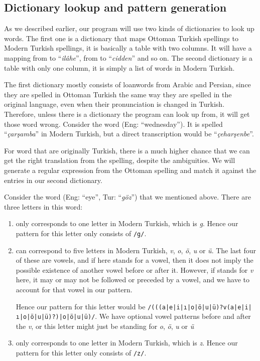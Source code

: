 \documentclass[10pt,twocolumn]{article}
\theoremstyle{nonumberplain}
\newcommand{\otto}[1]{\RLE{\ottoman{}\Large{}#1}}
\newcommand{\word}[1]{``\emph{#1}''}
\begin{document}
\subsection{Dictionary lookup and pattern generation}

As we described earlier, our program will use two kinds of dictionaries to look
up words. The first one is a dictionary that maps Ottoman Turkish spellings to
Modern Turkish spellings, it is basically a table with two columns.
It will have a mapping from \otto{الهه} to \word{ilâhe}, from \otto{جدا} to
\word{cidden} and so on. The second dictionary is a table with only one column,
it is simply a list of words in Modern Turkish.

The first dictionary mostly consists of loanwords from Arabic and Persian, since
they are spelled in Ottoman Turkish the same way they are spelled in the
original language, even when their pronunciation is changed in Turkish.
Therefore, unless there is a dictionary the program can look up from, it will
get those word wrong.
Consider the word \otto{چهارشنبه} (Eng: ``wednesday''). It is spelled
\word{çarşamba} in Modern Turkish, but a direct transcription would be
\word{çeharşenbe}.

For word that are originally Turkish, there is a much higher chance that we can
get the right translation from the spelling, despite the ambiguities.
We will generate a regular expression from the Ottoman spelling and match it
against the entries in our second dictionary.

Consider the word \otto{گوز} (Eng: ``eye'', Tur: \word{göz}) that we mentioned above.
There are three letters in this word: %
\begin{enumerate}[noitemsep,topsep=0pt]
  \item \otto{گ} only corresponds to one letter in Modern Turkish, which is
    \emph{g}. Hence our pattern for this letter only consists of \texttt{/g/}.
  \item \otto{و} can correspond to five letters in Modern Turkish, \emph{v},
    \emph{o}, \emph{ö}, \emph{u} or \emph{ü}. The last four of these are
    vowels, and if \otto{و} here stands for a vowel, then it does not imply the
    possible existence of another vowel before or after it. However, if
    \otto{و} stands for \emph{v} here, it may or may not be followed or
    preceded by a vowel, and we have to account for that vowel in our pattern.

    Hence our pattern for this letter would be
    \texttt{/(((a|e|i|ı|o|ö|u|ü)?v(a|e|i|ı|o|ö|u|ü)?)|o|ö|u|ü)/}.
    We have optional vowel patterns before and after the \emph{v}, or this
    letter might just be standing for \emph{o}, \emph{ö}, \emph{u} or \emph{ü}
\item \otto{ز} only corresponds to one letter in Modern Turkish, which is
    \emph{z}. Hence our pattern for this letter only consists of \texttt{/z/}.
\end{enumerate}
\end{document}
